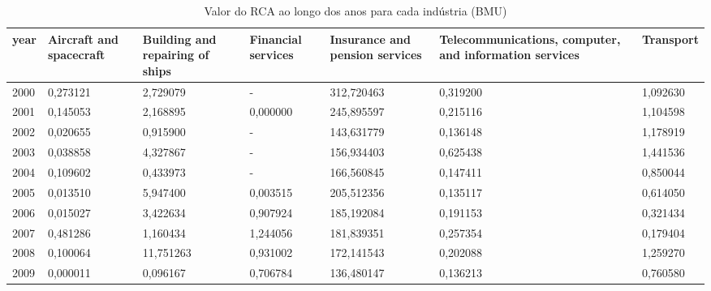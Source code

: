 \begin{table}
\centering
\caption{Valor do RCA ao longo dos anos para cada indústria (BMU)}
\begin{tabular}{p{1cm}p{2cm}p{2cm}p{2cm}p{2cm}p{2cm}p{2cm}}
\toprule
 year &  Aircraft and spacecraft &  Building and repairing of ships &  Financial services &  Insurance and pension services &  Telecommunications, computer, and information services &  Transport \\
\midrule
 2000 &                 0,273121 &                         2,729079 &                   - &                      312,720463 &                                           0,319200 &   1,092630 \\
 2001 &                 0,145053 &                         2,168895 &            0,000000 &                      245,895597 &                                           0,215116 &   1,104598 \\
 2002 &                 0,020655 &                         0,915900 &                   - &                      143,631779 &                                           0,136148 &   1,178919 \\
 2003 &                 0,038858 &                         4,327867 &                   - &                      156,934403 &                                           0,625438 &   1,441536 \\
 2004 &                 0,109602 &                         0,433973 &                   - &                      166,560845 &                                           0,147411 &   0,850044 \\
 2005 &                 0,013510 &                         5,947400 &            0,003515 &                      205,512356 &                                           0,135117 &   0,614050 \\
 2006 &                 0,015027 &                         3,422634 &            0,907924 &                      185,192084 &                                           0,191153 &   0,321434 \\
 2007 &                 0,481286 &                         1,160434 &            1,244056 &                      181,839351 &                                           0,257354 &   0,179404 \\
 2008 &                 0,100064 &                        11,751263 &            0,931002 &                      172,141543 &                                           0,202088 &   1,259270 \\
 2009 &                 0,000011 &                         0,096167 &            0,706784 &                      136,480147 &                                           0,136213 &   0,760580 \\

\end{tabular}
\end{table}
